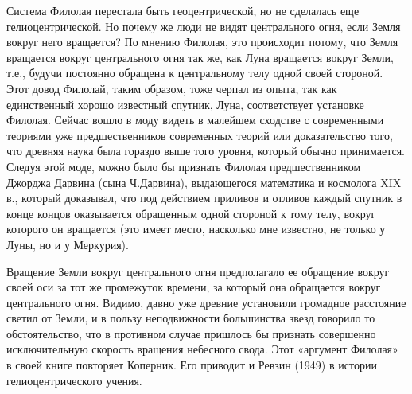 Система Филолая перестала быть геоцентрической, но не сделалась еще
гелиоцентрической. Но почему же люди не видят центрального огня, если
Земля вокруг него вращается? По мнению Филолая, это происходит потому,
что Земля вращается вокруг центрального огня так же, как Луна
вращается вокруг Земли, т.е., будучи постоянно обращена к
центральному телу одной своей стороной. Этот довод Филолай, таким
образом, тоже черпал из опыта, так как единственный хорошо известный
спутник, Луна, соответствует установке Филолая. Сейчас вошло в моду
видеть в малейшем сходстве с современными теориями уже
предшественников современных теорий или доказательство того, что
древняя наука была гораздо выше того уровня, который обычно
принимается. Следуя этой моде, можно было бы признать Филолая
предшественником Джорджа Дарвина (сына Ч.Дарвина), выдающегося
математика и космолога XIX в., который доказывал, что под действием
приливов и отливов каждый спутник в конце концов оказывается
обращенным одной стороной к тому телу, вокруг которого он вращается
(это имеет место, насколько мне известно, не только у Луны, но и у
Меркурия).

Вращение Земли вокруг центрального огня предполагало ее обращение
вокруг своей оси за тот же промежуток времени, за который она
обращается вокруг центрального огня. Видимо, давно уже древние
установили громадное расстояние светил от Земли, и в пользу
неподвижности большинства звезд говорило то обстоятельство, что в
противном случае пришлось бы признать совершенно исключительную
скорость вращения небесного свода. Этот «аргумент Филолая» в своей
книге повторяет Коперник. Его приводит и Ревзин (1949) в истории
гелиоцентрического учения.

